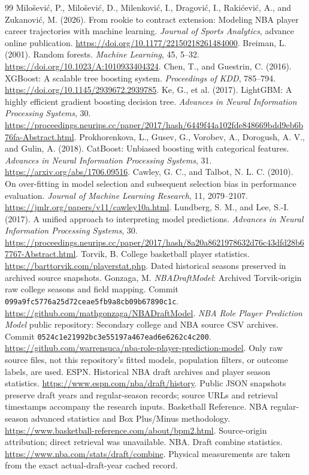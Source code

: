 \documentclass[11pt]{article}
\begin{document}
\begin{thebibliography}{99}
 Milo\v{s}evi\'{c}, P., Milo\v{s}evi\'{c}, D., Milenkovi\'{c}, I., Dragovi\'{c}, I., Raki\'{c}evi\'{c}, A., and Zukanovi\'{c}, M. (2026). From rookie to contract extension: Modeling NBA player career trajectories with machine learning. \emph{Journal of Sports Analytics}, advance online publication. \url{https://doi.org/10.1177/22150218261484000}.
 Breiman, L. (2001). Random forests. \emph{Machine Learning}, 45, 5--32. \url{https://doi.org/10.1023/A:1010933404324}.
 Chen, T., and Guestrin, C. (2016). XGBoost: A scalable tree boosting system. \emph{Proceedings of KDD}, 785--794. \url{https://doi.org/10.1145/2939672.2939785}.
 Ke, G., et al. (2017). LightGBM: A highly efficient gradient boosting decision tree. \emph{Advances in Neural Information Processing Systems}, 30. \url{https://proceedings.neurips.cc/paper/2017/hash/6449f44a102fde848669bdd9eb6b76fa-Abstract.html}.
 Prokhorenkova, L., Gusev, G., Vorobev, A., Dorogush, A. V., and Gulin, A. (2018). CatBoost: Unbiased boosting with categorical features. \emph{Advances in Neural Information Processing Systems}, 31. \url{https://arxiv.org/abs/1706.09516}.
 Cawley, G. C., and Talbot, N. L. C. (2010). On over-fitting in model selection and subsequent selection bias in performance evaluation. \emph{Journal of Machine Learning Research}, 11, 2079--2107. \url{https://jmlr.org/papers/v11/cawley10a.html}.
 Lundberg, S. M., and Lee, S.-I. (2017). A unified approach to interpreting model predictions. \emph{Advances in Neural Information Processing Systems}, 30. \url{https://proceedings.neurips.cc/paper/2017/hash/8a20a8621978632d76c43dfd28b67767-Abstract.html}.
 Torvik, B. College basketball player statistics. \url{https://barttorvik.com/playerstat.php}. Dated historical seasons preserved in archived source snapshots.
 Gonzaga, M. \emph{NBADraftModel}: Archived Torvik-origin raw college seasons and field mapping. Commit \texttt{099a9fc5776a25d72ceae5fb9a8cb09b67890c1c}. \url{https://github.com/mathgonzaga/NBADraftModel}.
 \emph{NBA Role Player Prediction Model} public repository: Secondary college and NBA source CSV archives. Commit \texttt{0524c1e21992bc3e55197a467ead6e6262c4c200}. \url{https://github.com/warrensuca/nba-role-player-prediction-model}. Only raw source files, not this repository's fitted models, population filters, or outcome labels, are used.
 ESPN. Historical NBA draft archives and player season statistics. \url{https://www.espn.com/nba/draft/history}. Public JSON snapshots preserve draft years and regular-season records; source URLs and retrieval timestamps accompany the research inputs.
 Basketball Reference. NBA regular-season advanced statistics and Box Plus/Minus methodology. \url{https://www.basketball-reference.com/about/bpm2.html}. Source-origin attribution; direct retrieval was unavailable.
 NBA. Draft combine statistics. \url{https://www.nba.com/stats/draft/combine}. Physical measurements are taken from the exact actual-draft-year cached record.
\end{thebibliography}
\end{document}
